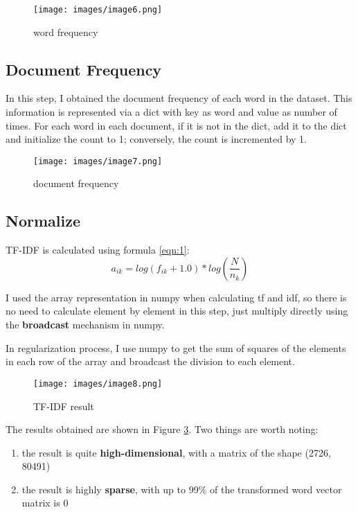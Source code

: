 \documentclass[12pt]{article}
\begin{document}
\begin{figure}[h]  %
    \centering     %
    \texttt{[image: images/image6.png]}
    \caption{word frequency}  %
    \label{fig:image1.6}  %
\end{figure}

\subsection{Document Frequency}
In this step, I obtained the document frequency of each word in the dataset. 
 This information is represented via a dict with key as word and value as number of times. For each word in each document, if it is not in the dict, add it to the dict and initialize the count to 1; conversely, the count is incremented by 1.

\begin{figure}[h]  %
    \centering     %
    \texttt{[image: images/image7.png]}
    \caption{document frequency}  %
    \label{fig:image1.7}  %
\end{figure}

\subsection{Normalize}
TF-IDF is calculated using formula \ref{eqn:1}:
\begin{equation}
    a_{ik} = log(f_{ik}+1.0) * log(\frac{N}{n_k})
    \label{eqn:1}
\end{equation}

I used the array representation in numpy when calculating tf and idf, so there is no need to calculate element by element in this step, just multiply directly using the \textbf{broadcast} mechanism in numpy.

In regularization process, I use numpy to get the sum of squares of the elements in each row of the array and broadcast the division to each element. 
\begin{figure}[h]  %
    \centering     %
    \texttt{[image: images/image8.png]}
    \caption{TF-IDF result}  %
    \label{fig:image1.8}  %
\end{figure}

The results obtained are shown in Figure \ref{fig:image1.8}. Two things are worth noting: 
\begin{enumerate}
    \item the result is quite \textbf{high-dimensional}, with a matrix of the shape (2726, 80491)
    \item the result is highly \textbf{sparse}, with up to 99\% of the transformed word vector matrix is 0
\end{enumerate}
\end{document}
